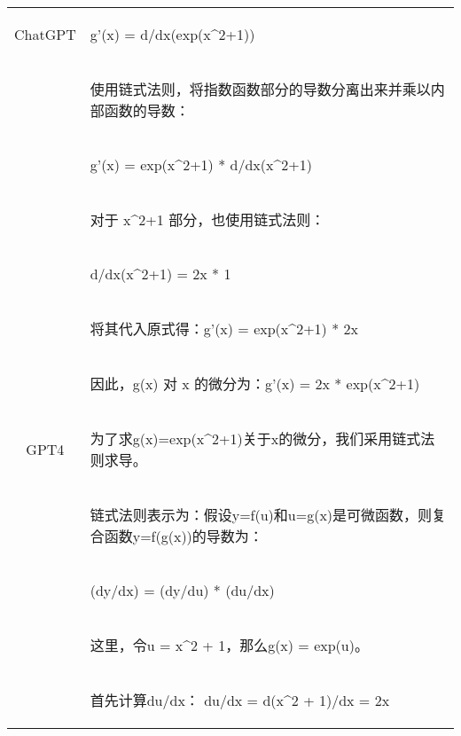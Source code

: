 \documentclass{article}
\begin{document}
\begin{table}[h!]
\begin{tabular}{ c|l }
  \hline
  ChatGPT & \begin{CJK*}{UTF8}{gbsn} g'(x) = d/dx(exp(x\^{}2+1)) \end{CJK*}\\
             & \begin{CJK*}{UTF8}{gbsn} 使用链式法则，将指数函数部分的导数分离出来并乘以内部函数的导数： \end{CJK*}\\
             & \begin{CJK*}{UTF8}{gbsn} g'(x) = exp(x\^{}2+1) * d/dx(x\^{}2+1) \end{CJK*}\\
             & \begin{CJK*}{UTF8}{gbsn} 对于 x\^{}2+1 部分，也使用链式法则： \end{CJK*}\\
             & \begin{CJK*}{UTF8}{gbsn} d/dx(x\^{}2+1) = 2x * 1 \end{CJK*}\\
             & \begin{CJK*}{UTF8}{gbsn} 将其代入原式得：g'(x) = exp(x\^{}2+1) * 2x \end{CJK*}\\
             & \begin{CJK*}{UTF8}{gbsn} 因此，g(x) 对 x 的微分为：g'(x) = 2x * exp(x\^{}2+1) \end{CJK*}\\
 \hline
 GPT4 & \begin{CJK*}{UTF8}{gbsn} 为了求g(x)=exp(x\^{}2+1)关于x的微分，我们采用链式法则求导。\end{CJK*}\\
             & \begin{CJK*}{UTF8}{gbsn} 链式法则表示为：假设y=f(u)和u=g(x)是可微函数，则复合函数y=f(g(x))的导数为： \end{CJK*}\\
             & \begin{CJK*}{UTF8}{gbsn} (dy/dx) = (dy/du) * (du/dx) \end{CJK*} \\
             & \begin{CJK*}{UTF8}{gbsn} 这里，令u = x\^{}2 + 1，那么g(x) = exp(u)。 \end{CJK*} \\
             & \begin{CJK*}{UTF8}{gbsn} 首先计算du/dx： du/dx = d(x\^{}2 + 1)/dx = 2x \end{CJK*} \\

\end{tabular}
\end{table}
\end{document}
